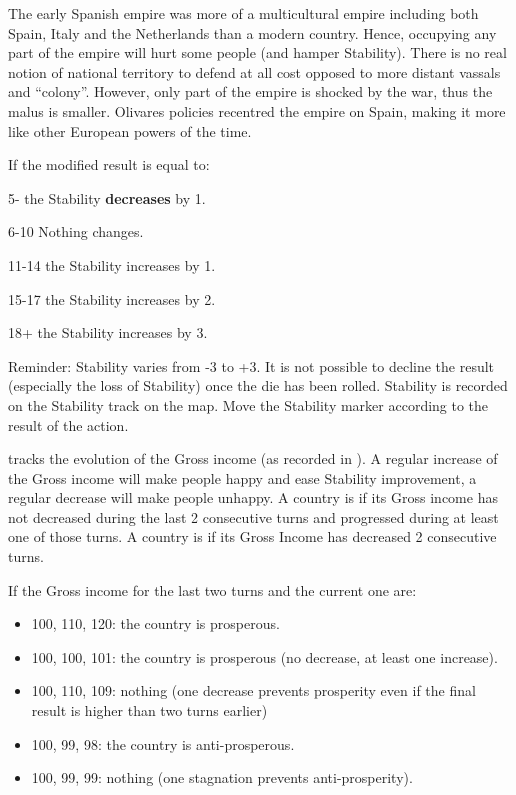 \begin{designnote}
  The early Spanish empire was more of a multicultural empire including both
  Spain, Italy and the Netherlands than a modern country. Hence, occupying
  any part of the empire will hurt some people (and hamper Stability). There
  is no real notion of national territory to defend at all cost opposed to
  more distant vassals and ``colony''. However, only part of the empire is
  shocked by the war, thus the malus is smaller. Olivares policies recentred
  the empire on Spain, making it more like other European powers of the time.
\end{designnote}

\aparag[Result] If the modified result is equal to:
\begin{modlist}
  \item[5-] the Stability \textbf{decreases} by 1.
  \item[6-10] Nothing changes.
  \item[11-14] the Stability increases by 1.
  \item[15-17] the Stability increases by 2.
  \item[18+] the Stability increases by 3.
\end{modlist}
\bparag Reminder: Stability varies from -3 to +3. It is not possible to
decline the result (especially the loss of Stability) once the die has been
rolled.
\bparag Stability is recorded on the Stability track on the \ROTW map. Move
the Stability marker according to the result of the action.

\aparag[Prosperity]\label{chPeace:Prosperity} tracks the evolution of the
Gross income (as recorded in ). A regular increase
of the Gross income will make people happy and ease Stability improvement, a
regular decrease will make people unhappy.
 A country is  if its Gross income
has not decreased during the last 2 consecutive turns and progressed during at
least one of those turns.
 A country is  if its
Gross Income has decreased 2 consecutive turns.

\begin{exemple}[Prosperity]
  If the Gross income for the last two turns and the current one are:
  \begin{itemize}
  \item 100, 110, 120: the country is prosperous.
  \item 100, 100, 101: the country is prosperous (no decrease, at least one
    increase).
  \item 100, 110, 109: nothing (one decrease prevents prosperity even if the
    final result is higher than two turns earlier)
  \item 100, 99, 98: the country is anti-prosperous.
  \item 100, 99, 99: nothing (one stagnation prevents anti-prosperity).
  \end{itemize}

\end{exemple}

